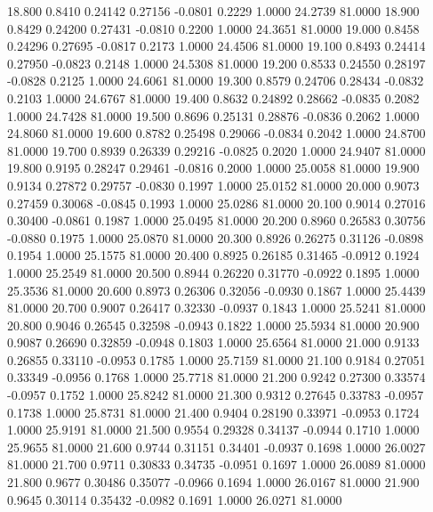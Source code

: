   18.800   0.8410   0.24142   0.27156  -0.0801   0.2229   1.0000  24.2739  81.0000
  18.900   0.8429   0.24200   0.27431  -0.0810   0.2200   1.0000  24.3651  81.0000
  19.000   0.8458   0.24296   0.27695  -0.0817   0.2173   1.0000  24.4506  81.0000
  19.100   0.8493   0.24414   0.27950  -0.0823   0.2148   1.0000  24.5308  81.0000
  19.200   0.8533   0.24550   0.28197  -0.0828   0.2125   1.0000  24.6061  81.0000
  19.300   0.8579   0.24706   0.28434  -0.0832   0.2103   1.0000  24.6767  81.0000
  19.400   0.8632   0.24892   0.28662  -0.0835   0.2082   1.0000  24.7428  81.0000
  19.500   0.8696   0.25131   0.28876  -0.0836   0.2062   1.0000  24.8060  81.0000
  19.600   0.8782   0.25498   0.29066  -0.0834   0.2042   1.0000  24.8700  81.0000
  19.700   0.8939   0.26339   0.29216  -0.0825   0.2020   1.0000  24.9407  81.0000
  19.800   0.9195   0.28247   0.29461  -0.0816   0.2000   1.0000  25.0058  81.0000
  19.900   0.9134   0.27872   0.29757  -0.0830   0.1997   1.0000  25.0152  81.0000
  20.000   0.9073   0.27459   0.30068  -0.0845   0.1993   1.0000  25.0286  81.0000
  20.100   0.9014   0.27016   0.30400  -0.0861   0.1987   1.0000  25.0495  81.0000
  20.200   0.8960   0.26583   0.30756  -0.0880   0.1975   1.0000  25.0870  81.0000
  20.300   0.8926   0.26275   0.31126  -0.0898   0.1954   1.0000  25.1575  81.0000
  20.400   0.8925   0.26185   0.31465  -0.0912   0.1924   1.0000  25.2549  81.0000
  20.500   0.8944   0.26220   0.31770  -0.0922   0.1895   1.0000  25.3536  81.0000
  20.600   0.8973   0.26306   0.32056  -0.0930   0.1867   1.0000  25.4439  81.0000
  20.700   0.9007   0.26417   0.32330  -0.0937   0.1843   1.0000  25.5241  81.0000
  20.800   0.9046   0.26545   0.32598  -0.0943   0.1822   1.0000  25.5934  81.0000
  20.900   0.9087   0.26690   0.32859  -0.0948   0.1803   1.0000  25.6564  81.0000
  21.000   0.9133   0.26855   0.33110  -0.0953   0.1785   1.0000  25.7159  81.0000
  21.100   0.9184   0.27051   0.33349  -0.0956   0.1768   1.0000  25.7718  81.0000
  21.200   0.9242   0.27300   0.33574  -0.0957   0.1752   1.0000  25.8242  81.0000
  21.300   0.9312   0.27645   0.33783  -0.0957   0.1738   1.0000  25.8731  81.0000
  21.400   0.9404   0.28190   0.33971  -0.0953   0.1724   1.0000  25.9191  81.0000
  21.500   0.9554   0.29328   0.34137  -0.0944   0.1710   1.0000  25.9655  81.0000
  21.600   0.9744   0.31151   0.34401  -0.0937   0.1698   1.0000  26.0027  81.0000
  21.700   0.9711   0.30833   0.34735  -0.0951   0.1697   1.0000  26.0089  81.0000
  21.800   0.9677   0.30486   0.35077  -0.0966   0.1694   1.0000  26.0167  81.0000
  21.900   0.9645   0.30114   0.35432  -0.0982   0.1691   1.0000  26.0271  81.0000
